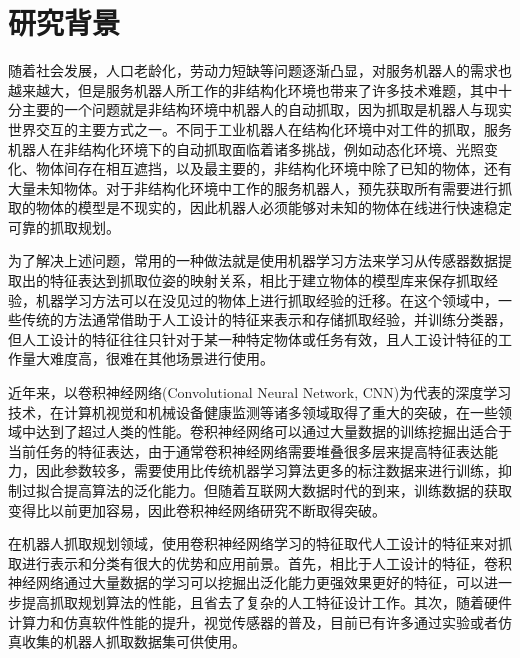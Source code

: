 \documentclass[no-math, withoutpreface]{YangThesis}
\begin{document}
\tableofcontents

\clearpage
\vspace{-1cm}
\section{研究背景}

\setcounter{page}{1}

随着社会发展，人口老龄化，劳动力短缺等问题逐渐凸显，对服务机器人的需求也越来越大，但是服务机器人所工作的非结构化环境也带来了许多技术难题，其中十分主要的一个问题就是非结构环境中机器人的自动抓取，因为抓取是机器人与现实世界交互的主要方式之一。不同于工业机器人在结构化环境中对工件的抓取，服务机器人在非结构化环境下的自动抓取面临着诸多挑战，例如动态化环境、光照变化、物体间存在相互遮挡，以及最主要的，非结构化环境中除了已知的物体，还有大量未知物体。对于非结构化环境中工作的服务机器人，预先获取所有需要进行抓取的物体的模型是不现实的，因此机器人必须能够对未知的物体在线进行快速稳定可靠的抓取规划。

为了解决上述问题，常用的一种做法就是使用机器学习方法来学习从传感器数据提取出的特征表达到抓取位姿的映射关系，相比于建立物体的模型库来保存抓取经验，机器学习方法可以在没见过的物体上进行抓取经验的迁移。在这个领域中，一些传统的方法通常借助于人工设计的特征来表示和存储抓取经验，并训练分类器，但人工设计的特征往往只针对于某一种特定物体或任务有效，且人工设计特征的工作量大难度高，很难在其他场景进行使用。
 
近年来，以卷积神经网络(Convolutional Neural Network, CNN)为代表的深度学习技术，在计算机视觉和机械设备健康监测等诸多领域取得了重大的突破，在一些领域中达到了超过人类的性能。卷积神经网络可以通过大量数据的训练挖掘出适合于当前任务的特征表达，由于通常卷积神经网络需要堆叠很多层来提高特征表达能力，因此参数较多，需要使用比传统机器学习算法更多的标注数据来进行训练，抑制过拟合提高算法的泛化能力。但随着互联网大数据时代的到来，训练数据的获取变得比以前更加容易，因此卷积神经网络研究不断取得突破。

在机器人抓取规划领域，使用卷积神经网络学习的特征取代人工设计的特征来对抓取进行表示和分类有很大的优势和应用前景。首先，相比于人工设计的特征，卷积神经网络通过大量数据的学习可以挖掘出泛化能力更强效果更好的特征，可以进一步提高抓取规划算法的性能，且省去了复杂的人工特征设计工作。其次，随着硬件计算力和仿真软件性能的提升，视觉传感器的普及，目前已有许多通过实验或者仿真收集的机器人抓取数据集可供使用。
 
\end{document}
